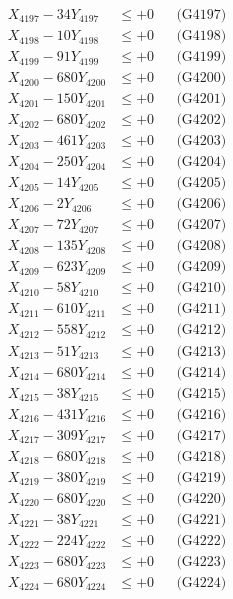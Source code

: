 \documentclass[a4paper,10pt]{article}
\begin{document}
{\begin{align}
X_{4197} - 34Y_{4197} &\leq +0 && \text{(G4197)} \\
X_{4198} - 10Y_{4198} &\leq +0 && \text{(G4198)} \\
X_{4199} - 91Y_{4199} &\leq +0 && \text{(G4199)} \\
X_{4200} - 680Y_{4200} &\leq +0 && \text{(G4200)} \\
\allowbreak
X_{4201} - 150Y_{4201} &\leq +0 && \text{(G4201)} \\
X_{4202} - 680Y_{4202} &\leq +0 && \text{(G4202)} \\
X_{4203} - 461Y_{4203} &\leq +0 && \text{(G4203)} \\
X_{4204} - 250Y_{4204} &\leq +0 && \text{(G4204)} \\
X_{4205} - 14Y_{4205} &\leq +0 && \text{(G4205)} \\
X_{4206} - 2Y_{4206} &\leq +0 && \text{(G4206)} \\
X_{4207} - 72Y_{4207} &\leq +0 && \text{(G4207)} \\
X_{4208} - 135Y_{4208} &\leq +0 && \text{(G4208)} \\
X_{4209} - 623Y_{4209} &\leq +0 && \text{(G4209)} \\
X_{4210} - 58Y_{4210} &\leq +0 && \text{(G4210)} \\
\allowbreak
X_{4211} - 610Y_{4211} &\leq +0 && \text{(G4211)} \\
X_{4212} - 558Y_{4212} &\leq +0 && \text{(G4212)} \\
X_{4213} - 51Y_{4213} &\leq +0 && \text{(G4213)} \\
X_{4214} - 680Y_{4214} &\leq +0 && \text{(G4214)} \\
X_{4215} - 38Y_{4215} &\leq +0 && \text{(G4215)} \\
X_{4216} - 431Y_{4216} &\leq +0 && \text{(G4216)} \\
X_{4217} - 309Y_{4217} &\leq +0 && \text{(G4217)} \\
X_{4218} - 680Y_{4218} &\leq +0 && \text{(G4218)} \\
X_{4219} - 380Y_{4219} &\leq +0 && \text{(G4219)} \\
X_{4220} - 680Y_{4220} &\leq +0 && \text{(G4220)} \\
\allowbreak
X_{4221} - 38Y_{4221} &\leq +0 && \text{(G4221)} \\
X_{4222} - 224Y_{4222} &\leq +0 && \text{(G4222)} \\
X_{4223} - 680Y_{4223} &\leq +0 && \text{(G4223)} \\
X_{4224} - 680Y_{4224} &\leq +0 && \text{(G4224)} \\

\end{align}}
\end{document}
